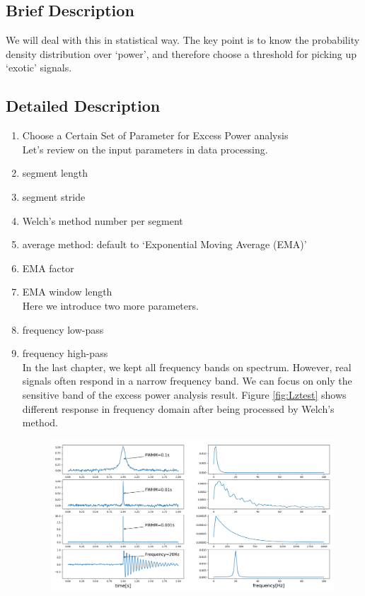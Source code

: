 \documentclass[
12pt, %
a4paper %
]{extreport}
\theoremstyle{plain}
\begin{document}
\subsection{Brief Description}
We will deal with this in statistical way. The key point is to know the probability density distribution over `power', and therefore choose a threshold for picking up `exotic' signals.
\subsection{Detailed Description}
\begin{enumerate}
\item Choose a Certain Set of Parameter for Excess Power analysis\\
Let’s review on the input parameters in data processing. 
\item[] segment length
\item[] segment stride
\item[] Welch’s method number per segment
\item[] average method: default to `Exponential Moving Average (EMA)'
\item[] EMA factor
\item[] EMA window length\\
Here we introduce two more parameters.
\item[] frequency low-pass
\item[] frequency high-pass\\
In the last chapter, we kept all frequency bands on spectrum. However, real signals often respond in a narrow frequency band. We can focus on only the sensitive band of the excess power analysis result. Figure \ref{fig:Lztest} shows different response in frequency domain after being processed by Welch’s method. 
\begin{figure}[h]
	\centering
	\includegraphics[width=\textwidth]{Lztest.png}

\end{figure}
\end{enumerate}
\end{document}
